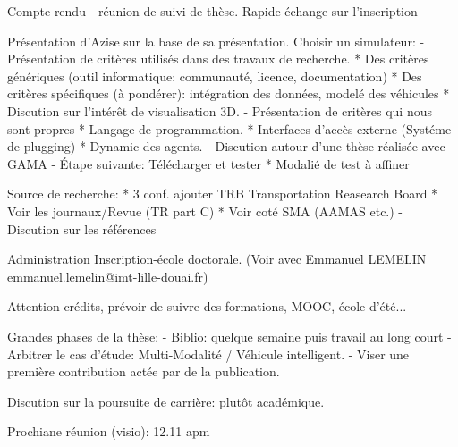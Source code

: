 Compte rendu - réunion de suivi de thèse.
Rapide échange sur l'inscription

Présentation d'Azise sur la base de sa présentation.
Choisir un simulateur: - Présentation de critères utilisés dans des travaux de recherche. * Des critères génériques (outil informatique: communauté, licence, documentation) * Des critères spécifiques (à pondérer): intégration des données, modelé des véhicules * Discution sur l'intérêt de visualisation 3D. - Présentation de critères qui nous sont propres * Langage de programmation. * Interfaces d'accès externe (Systéme de plugging) * Dynamic des agents. - Discution autour d'une thèse réalisée avec GAMA - Étape suivante: Télécharger et tester * Modalié de test à affiner

Source de recherche: * 3 conf. ajouter TRB Transportation Reasearch Board * Voir les journaux/Revue (TR part C) * Voir coté SMA (AAMAS etc.) - Discution sur les références

Administration
Inscription-école doctorale. (Voir avec Emmanuel LEMELIN emmanuel.lemelin@imt-lille-douai.fr)

Attention crédits, prévoir de suivre des formations, MOOC, école d'été...

Grandes phases de la thèse: - Biblio: quelque semaine puis travail au long court - Arbitrer le cas d'étude: Multi-Modalité / Véhicule intelligent. - Viser une première contribution actée par de la publication.

Discution sur la poursuite de carrière: plutôt académique.

Prochiane réunion (visio): 12.11 apm